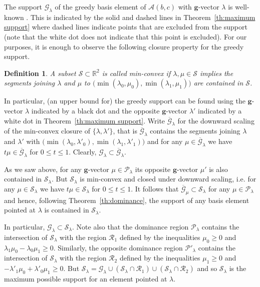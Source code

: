 \documentclass{amsart}
\newtheorem{definition}[theorem]{Definition}
\numberwithin{theorem}{section}
\newcommand{\bfg}{\boldsymbol{g}}
\newcommand{\cA}{\mathcal{A}}
\newcommand{\cG}{\mathcal{G}}
\newcommand{\cP}{\mathcal{P}}
\newcommand{\cR}{\mathcal{R}}
\newcommand{\cS}{\mathcal{S}}
\newcommand{\RR}{\mathbb{R}}
\begin{document}
  The support $\cG_\lambda$ of the greedy basis element of $\cA(b,c)$ with $\bfg$-vector $\lambda$ is well-known \cite{LLZ,cgmmrsw}.
  This is indicated by the solid and dashed lines in Theorem~\ref{th:maximum support} where dashed lines indicate points that are excluded from the support (note that the white dot does not indicate that this point is excluded).
  For our purposes, it is enough to observe the following closure property for the greedy support.
  \begin{definition}
    A subset $\cS\subset\RR^2$ is called \emph{min-convex} if $\lambda,\mu\in\cS$ implies the segments joining $\lambda$ and $\mu$ to $\big(\min(\lambda_0,\mu_0),\min(\lambda_1,\mu_1)\big)$ are contained in $\cS$.
  \end{definition}
  In particular, (an upper bound for) the greedy support can be found using the $\bfg$-vector $\lambda$ indicated by a black dot and the opposite $\bfg$-vector $\lambda'$ indicated by a white dot in Theorem~\ref{th:maximum support}.
  Write $\overline{\cG}_\lambda$ for the downward scaling of the min-convex closure of $\{\lambda,\lambda'\}$, that is $\overline{\cG}_\lambda$ contains the segments joining $\lambda$ and $\lambda'$ with $\big(\min(\lambda_0,\lambda'_0),\min(\lambda_1,\lambda'_1)\big)$ and for any $\mu\in\overline{\cG}_\lambda$ we have $t\mu\in\overline{\cG}_\lambda$ for $0\le t\le 1$.
  Clearly, $\cG_\lambda\subset\overline{\cG}_\lambda$.

  As we saw above, for any $\bfg$-vector $\mu\in\cP_\lambda$ its opposite $\bfg$-vector $\mu'$ is also contained in $\cS_\lambda$.
  But $\cS_\lambda$ is min-convex and closed under downward scaling, i.e. for any $\mu\in\cS_\lambda$ we have $t\mu\in\cS_\lambda$ for $0\le t\le 1$.
  It follows that $\overline{\cG}_\mu\subset\cS_\lambda$ for any $\mu\in\cP_\lambda$ and hence, following Theorem~\ref{th:dominance}, the support of any basis element pointed at $\lambda$ is contained in $\cS_\lambda$.

  In particular, $\cG_\lambda\subset\cS_\lambda$.
  Note also that the dominance region $\cP_\lambda$ contains the intersection of $\cS_\lambda$ with the region $\cR_1$ defined by the inequalities $\mu_0\ge0$ and $\lambda_1\mu_0-\lambda_0\mu_1\ge0$.
  Similarly, the opposite dominance region $\cP'_\lambda$ contains the intersection of $\cS_\lambda$ with the region $\cR_2$ defined by the inequalities $\mu_1\ge0$ and $-\lambda'_1\mu_0+\lambda'_0\mu_1\ge0$.
  But $\cS_\lambda=\cG_\lambda\cup(\cS_\lambda\cap\cR_1)\cup(\cS_\lambda\cap\cR_2)$ and so $\cS_\lambda$ is the maximum possible support for an element pointed at $\lambda$.
\end{document}
